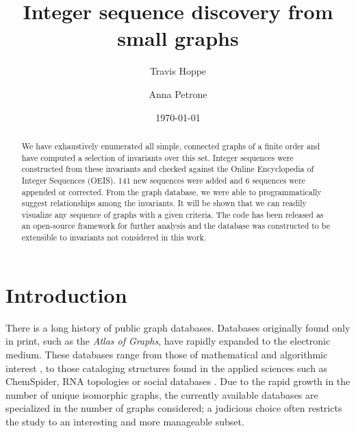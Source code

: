 \documentclass[12pt]{article}
\newcommand{\OEISeditsMain}{141\xspace}
\newcommand{\OEISeditsExtended}{6\xspace}
\begin{document}
\title{Integer sequence discovery from small graphs}
\author[1]{Travis Hoppe}
\author[2]{Anna Petrone}

\date{\today}
\maketitle

\begin{abstract}
We have exhaustively enumerated all simple, connected graphs of a finite order and have computed a selection of invariants over this set.
Integer sequences were constructed from these invariants and checked against the Online Encyclopedia of Integer Sequences (OEIS).
\OEISeditsMain new sequences were added and \OEISeditsExtended sequences were appended or corrected.
From the graph database, we were able to programmatically suggest relationships among the invariants.
It will be shown that we can readily visualize any sequence of graphs with a given criteria. 
The code has been released as an open-source framework for further analysis and the database was constructed to be extensible to invariants not considered in this work.
\end{abstract}

\section{Introduction}

There is a long history of public graph databases. 
Databases originally found only in print, such as the \textit{Atlas of Graphs}\cite{read1998atlas}, have rapidly expanded to the electronic medium.
These databases range from those of mathematical and algorithmic interest \cite{de2003large, brinkmann2013house}, to those cataloging structures found in the applied sciences such as ChemSpider\cite{pence2010chemspider}, RNA topologies\cite{gan2004rag, laing2013predicting} or social databases \cite{mcauley2014circles,brandes2009wikipedia,oestreicher2006amazon}.
Due to the rapid growth in the number of unique isomorphic graphs, the currently available databases are specialized in the number of graphs considered; 
a judicious choice often restricts the study to an interesting and more manageable subset.
\end{document}

